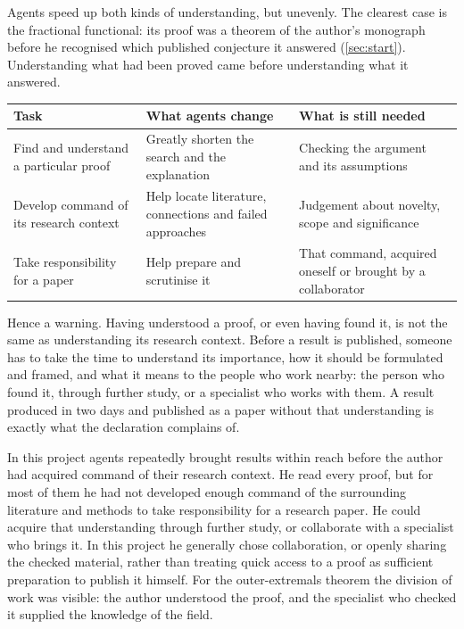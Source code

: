 \documentclass[11pt]{amsart}
\begin{document}
Agents speed up both kinds of understanding, but unevenly. The clearest case is
the fractional functional: its proof was a theorem of the author's monograph
before he recognised which published conjecture it answered (\cref{sec:start}).
Understanding what had been proved came before understanding what it answered.
\begin{center}
  \small
  \begin{tabular}{p{}p{}p{}}
    \toprule
    Task                                    & What agents change                                        & What is still needed                                        \\
    \midrule
    Find and understand a particular proof  & Greatly shorten the search and the explanation            & Checking the argument and its assumptions                   \\
    Develop command of its research context & Help locate literature, connections and failed approaches & Judgement about novelty, scope and significance             \\
    Take responsibility for a paper         & Help prepare and scrutinise it                            & That command, acquired oneself or brought by a collaborator \\
    \bottomrule
  \end{tabular}
\end{center}
Hence a warning. Having understood a proof, or even having found it, is not the
same as understanding its research context. Before a result is published,
someone has to take the time to understand its importance, how it should be
formulated and framed, and what it means to the people who work nearby: the
person who found it, through further study, or a specialist who works with
them. A result produced in two days and published as a paper without that
understanding is exactly what the declaration complains of.

In this project agents repeatedly brought results within reach before the
author had acquired command of their research context. He read every proof, but
for most of them he had not developed enough command of the surrounding
literature and methods to take responsibility for a research paper. He could
acquire that understanding through further study, or collaborate with a
specialist who brings it. In this project he generally chose collaboration, or
openly sharing the checked material, rather than treating quick access to a
proof as sufficient preparation to publish it himself. For the outer-extremals
theorem the division of work was visible: the author understood the proof, and
the specialist who checked it supplied the knowledge of the field.
\end{document}
